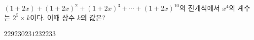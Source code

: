 $(1+2x)+(1+2x)^2+(1+2x)^3+\cdots+(1+2x)^{10}$의 전개식에서 $x^4$의 계수는 $2^5\times k$이다. 이때 상수 $k$의 값은?
\begin{choices32}{$229$}{$230$}{$231$}{$232$}{$233$}\end{choices32}
